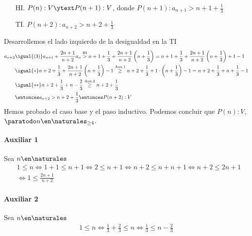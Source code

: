 \begin{enumerate}[label=\roman*)]
        \begin{enumerate}
          \item[HI.] $P(n):V \ytext P(n+1):V$, donde $P(n+1): a_{n+1} > n + 1 + \displaystyle \frac{1}{3}$
          \item[TI.] $P(n+2): a_{n+2} > n + 2 + \displaystyle \frac{1}{3}$
        \end{enumerate}
        Desarrollemos el lado izquierdo de la desigualdad en la TI
        \begin{align*}
          a_{n+2} & \igual{(3)} a_{n+1} + \frac{2n+1}{n+2}a_n \overset{\text{HI}}{>}
          n + 1 + \frac{1}{3} + \frac{2n+1}{n+2}\left(n + \frac{1}{3}\right)
          = n + 1 + \frac{1}{3} + \frac{2n+1}{n+2}\left(n + \frac{1}{3}\right) + 1 - 1                                \\
                  & \igual{*} n + 2 + \frac{1}{3} + \frac{2n+1}{n+2}\left(n + \frac{1}{3}\right) - 1
          \overset{\text{Aux.1}}{\geq} n + 2 + \frac{1}{3} + 1 \cdot \left(n + \frac{1}{3}\right) - 1
          = n + 2 + \frac{1}{3} + n + \frac{1}{3} - 1                                                                 \\
                  & \igual{**} n + 2 + \frac{1}{3} + n - \frac{2}{3} \overset{\text{Aux.2}}{\geq} n + 2 + \frac{1}{3} \\
                  & \entonces a_{n+2} > n + 2 + \frac{1}{3} \entonces P(n+2):V
        \end{align*}
        Hemos probado el caso base y el paso inductivo. Podemos concluir que $P(n):V,$ $\paratodo n \en \naturales _{\geq 4}$.

        \paragraph{Auxiliar 1}{Sea $n \en \naturales $
          \begin{align*}
             & 1 \leq n \iff 1 + 1 \leq n + 1 \iff 2 \leq n + 1 \iff n + 2 \leq n + n + 1 \iff n + 2 \leq 2n + 1 \\
             & \iff 1 \leq \frac{2n+1}{n+2}
          \end{align*}
        }

        \paragraph{Auxiliar 2}{Sea $n \en \naturales $
          \begin{align*}
            1 \leq n \iff \frac{1}{3} + \frac{2}{3} \leq n \iff \frac{1}{3} \leq n - \frac{2}{3}
          \end{align*}
        }

\end{enumerate}

